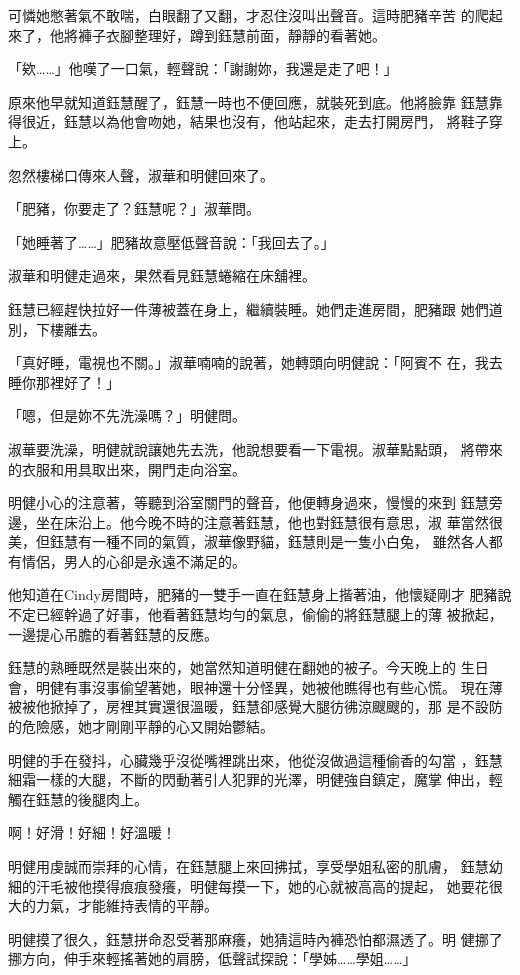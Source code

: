 可憐她憋著氣不敢喘，白眼翻了又翻，才忍住沒叫出聲音。這時肥豬辛苦
的爬起來了，他將褲子衣腳整理好，蹲到鈺慧前面，靜靜的看著她。

「欸……」他嘆了一口氣，輕聲說：「謝謝妳，我還是走了吧！」

原來他早就知道鈺慧醒了，鈺慧一時也不便回應，就裝死到底。他將臉靠
鈺慧靠得很近，鈺慧以為他會吻她，結果也沒有，他站起來，走去打開房門，
將鞋子穿上。

忽然樓梯口傳來人聲，淑華和明健回來了。

「肥豬，你要走了？鈺慧呢？」淑華問。

「她睡著了……」肥豬故意壓低聲音說：「我回去了。」

淑華和明健走過來，果然看見鈺慧蜷縮在床舖裡。

鈺慧已經趕快拉好一件薄被蓋在身上，繼續裝睡。她們走進房間，肥豬跟
她們道別，下樓離去。

「真好睡，電視也不關。」淑華喃喃的說著，她轉頭向明健說：「阿賓不
在，我去睡你那裡好了！」

「嗯，但是妳不先洗澡嗎？」明健問。

淑華要洗澡，明健就說讓她先去洗，他說想要看一下電視。淑華點點頭，
將帶來的衣服和用具取出來，開門走向浴室。

明健小心的注意著，等聽到浴室關門的聲音，他便轉身過來，慢慢的來到
鈺慧旁邊，坐在床沿上。他今晚不時的注意著鈺慧，他也對鈺慧很有意思，淑
華當然很美，但鈺慧有一種不同的氣質，淑華像野貓，鈺慧則是一隻小白兔，
雖然各人都有情侶，男人的心卻是永遠不滿足的。

他知道在Cindy房間時，肥豬的一雙手一直在鈺慧身上揩著油，他懷疑剛才
肥豬說不定已經幹過了好事，他看著鈺慧均勻的氣息，偷偷的將鈺慧腿上的薄
被掀起，一邊提心吊膽的看著鈺慧的反應。

鈺慧的熟睡既然是裝出來的，她當然知道明健在翻她的被子。今天晚上的
生日會，明健有事沒事偷望著她，眼神還十分怪異，她被他瞧得也有些心慌。
現在薄被被他掀掉了，房裡其實還很溫暖，鈺慧卻感覺大腿彷彿涼颼颼的，那
是不設防的危險感，她才剛剛平靜的心又開始鬱結。

明健的手在發抖，心臟幾乎沒從嘴裡跳出來，他從沒做過這種偷香的勾當
，鈺慧細霜一樣的大腿，不斷的閃動著引人犯罪的光澤，明健強自鎮定，魔掌
伸出，輕觸在鈺慧的後腿肉上。

啊！好滑！好細！好溫暖！

明健用虔誠而崇拜的心情，在鈺慧腿上來回拂拭，享受學姐私密的肌膚，
鈺慧幼細的汗毛被他摸得痕痕發癢，明健每摸一下，她的心就被高高的提起，
她要花很大的力氣，才能維持表情的平靜。

明健摸了很久，鈺慧拼命忍受著那麻癢，她猜這時內褲恐怕都濕透了。明
健挪了挪方向，伸手來輕搖著她的肩膀，低聲試探說：「學姊……學姐……」

